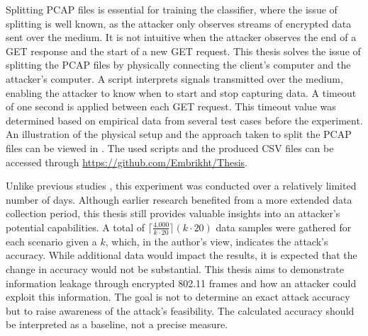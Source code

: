 Splitting PCAP files is essential for training the classifier, where the issue of splitting is well known, as the attacker only observes streams of encrypted data sent over the medium. It is not intuitive when the attacker observes the end of a GET response and the start of a new GET request. This thesis solves the issue of splitting the PCAP files by physically connecting the client's computer and the attacker's computer. A script interprets signals transmitted over the medium, enabling the attacker to know when to start and stop capturing data. A timeout of one second is applied between each GET request. This timeout value was determined based on empirical data from several test cases before the experiment. An illustration of the physical setup and the approach taken to split the PCAP files can be viewed in . The used scripts and the produced CSV files can be accessed through \url{https://github.com/Embrikht/Thesis}.

Unlike previous studies \cite{DBLP:conf/ccs/HerrmannWF09, DBLP:conf/ccs/LiberatoreL06}, this experiment was conducted over a relatively limited number of days. Although earlier research benefited from a more extended data collection period, this thesis still provides valuable insights into an attacker's potential capabilities. A total of $\lceil \tfrac{4.000}{k \cdot 20} \rceil (k \cdot 20)$ data samples were gathered for each scenario given a $k$, which, in the author's view, indicates the attack's accuracy. While additional data would impact the results, it is expected that the change in accuracy would not be substantial. This thesis aims to demonstrate information leakage through encrypted 802.11 frames and how an attacker could exploit this information. The goal is not to determine an exact attack accuracy but to raise awareness of the attack's feasibility. The calculated accuracy should be interpreted as a baseline, not a precise measure.
